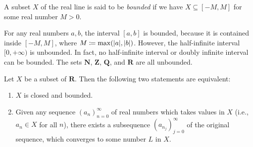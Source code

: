 \begin{definition}\label{9.1.22}
    A subset \(X\) of the real line is said to be \emph{bounded} if we have \(X \subseteq [-M, M]\) for some real number \(M > 0\).
\end{definition}

\begin{example}\label{9.1.23}
    For any real numbers \(a, b\), the interval \([a, b]\) is bounded, because it is contained inside \([-M, M]\), where \(M \coloneqq \max(\abs*{a}, \abs*{b})\).
    However, the half-infinite interval \([0, +\infty)\) is unbounded.
    In fact, no half-infinite interval or doubly infinite interval can be bounded.
    The sets \(\mathbf{N}\), \(\mathbf{Z}\), \(\mathbf{Q}\), and \(\mathbf{R}\) are all unbounded.
\end{example}

\begin{theorem}\label{9.1.24}
    Let \(X\) be a subset of \(\mathbf{R}\).
    Then the following two statements are equivalent:
    \begin{enumerate}
        \item \(X\) is closed and bounded.
        \item Given any sequence \((a_n)_{n = 0}^\infty\) of real numbers which takes values in \(X\) (i.e., \(a_n \in X\) for all \(n\)), there exists a subsequence \((a_{n_j})_{j = 0}^\infty\) of the original sequence, which converges to some number \(L\) in \(X\).
    \end{enumerate}
\end{theorem}

